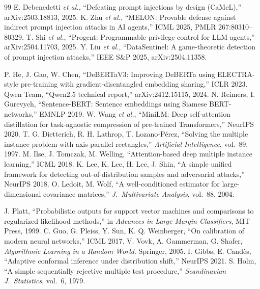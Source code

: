 \documentclass[conference,compsoc]{IEEEtran}
\begin{document}
\begin{thebibliography}{99}
 E. Debenedetti \textit{et al.}, ``Defeating prompt injections by design (CaMeL),'' arXiv:2503.18813, 2025.
 K. Zhu \textit{et al.}, ``MELON: Provable defense against indirect prompt injection attacks in AI agents,'' ICML 2025, PMLR 267:80310--80329.
 T. Shi \textit{et al.}, ``Progent: Programmable privilege control for LLM agents,'' arXiv:2504.11703, 2025.
 Y. Liu \textit{et al.}, ``DataSentinel: A game-theoretic detection of prompt injection attacks,'' IEEE S\&P 2025, arXiv:2504.11358.

 P. He, J. Gao, W. Chen, ``DeBERTaV3: Improving DeBERTa using ELECTRA-style pre-training with gradient-disentangled embedding sharing,'' ICLR 2023.
 Qwen Team, ``Qwen2.5 technical report,'' arXiv:2412.15115, 2024.
 N. Reimers, I. Gurevych, ``Sentence-BERT: Sentence embeddings using Siamese BERT-networks,'' EMNLP 2019.
 W. Wang \textit{et al.}, ``MiniLM: Deep self-attention distillation for task-agnostic compression of pre-trained Transformers,'' NeurIPS 2020.
 T. G. Dietterich, R. H. Lathrop, T. Lozano-P{\'e}rez, ``Solving the multiple instance problem with axis-parallel rectangles,'' \textit{Artificial Intelligence}, vol.\ 89, 1997.
 M. Ilse, J. Tomczak, M. Welling, ``Attention-based deep multiple instance learning,'' ICML 2018.
 K. Lee, K. Lee, H. Lee, J. Shin, ``A simple unified framework for detecting out-of-distribution samples and adversarial attacks,'' NeurIPS 2018.
 O. Ledoit, M. Wolf, ``A well-conditioned estimator for large-dimensional covariance matrices,'' \textit{J.\ Multivariate Analysis}, vol.\ 88, 2004.

 J. Platt, ``Probabilistic outputs for support vector machines and comparisons to regularized likelihood methods,'' in \textit{Advances in Large Margin Classifiers}, MIT Press, 1999.
 C. Guo, G. Pleiss, Y. Sun, K. Q. Weinberger, ``On calibration of modern neural networks,'' ICML 2017.
 V. Vovk, A. Gammerman, G. Shafer, \textit{Algorithmic Learning in a Random World}. Springer, 2005.
 I. Gibbs, E. Cand{\`e}s, ``Adaptive conformal inference under distribution shift,'' NeurIPS 2021.
 S. Holm, ``A simple sequentially rejective multiple test procedure,'' \textit{Scandinavian J.\ Statistics}, vol.\ 6, 1979.


\end{thebibliography}
\end{document}
